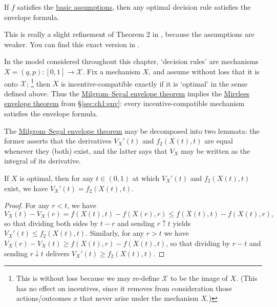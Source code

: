 \begin{namedthm}
	\label{theorem:MS_envelope}
	If $f$ satisfies the \hyperref[assumption:basic]{basic assumptions},
	then any optimal decision rule satisfies the envelope formula.
\end{namedthm}

This is really a slight refinement of Theorem 2 in \textcite{MilgromSegal2002}, because the assumptions are weaker. You can find this exact version in \textcite{Sinander2022}.


\addtocounter{example}{-1}
\begin{example}[continued]
	\label{example:env_mech_ic}
	In the model considered throughout this chapter,
	`decision rules' are mechanisms $X = (q,p) : [0,1] \to \mathcal{X}$.
	Fix a mechanism $X$,
	and assume without loss that it is onto $\mathcal{X}$;%
		\footnote{This is without loss because we may re-define $\mathcal{X}$ to be the image of $X$.
		(This has no effect on incentives, since it removes from consideration those actions/outcomes $x$ that never arise under the mechanism $X$.)}
	then $X$ is incentive-compatible exactly if it is `optimal' in the sense defined above.
	Thus the \hyperref[theorem:MS_envelope]{Milgrom--Segal envelope theorem} implies the \hyperref[proposition:ic_env]{Mirrlees envelope theorem} from §\ref{sec:ch1:env}:
	every incentive-compatible mechanism satisfies the envelope formula.
\end{example}


The \hyperref[theorem:MS_envelope]{Milgrom--Segal envelope theorem} may be decomposed into two lemmata:
the former asserts that the derivatives $V_X'(t)$ and $f_2(X(t),t)$ are equal whenever they (both) exist,
and the latter says that $V_X$ may be written as the integral of its derivative.


\begin{lemma}
	\label{lemma:deriv_value}
	If $X$ is optimal,
	then for any $t \in (0,1)$
	at which $V_X'(t)$ and $f_2(X(t),t)$ exist,
	we have $V_X'(t) = f_2(X(t),t)$.
\end{lemma}

\begin{proof}
	For any $r<t$, we have
	\begin{equation*}
		V_X(t) - V_X(r)
		= f(X(t),t) - f(X(r),r)
		\leq f(X(t),t) - f(X(t),r) ,
	\end{equation*}
	so that dividing both sides by $t-r$ and sending $r \uparrow t$ yields $V_X'(t) \leq f_2(X(t),t)$.
	Similarly, for any $r>t$ we have
	$V_X(r) - V_X(t) \geq f(X(t),r) - f(X(t),t)$,
	so that dividing by $r-t$ and sending $r \downarrow t$
	delivers $V_X'(t) \geq f_2(X(t),t)$.
\end{proof}


